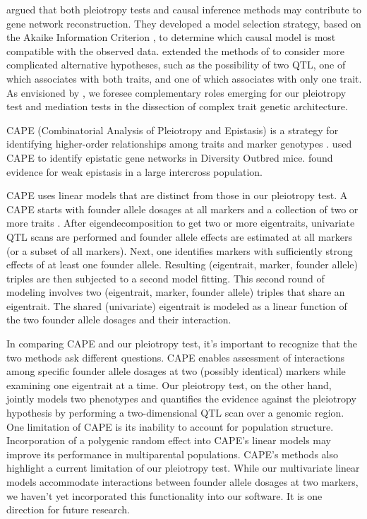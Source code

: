 \documentclass[oneside]{book}\usepackage[]{graphicx}\usepackage[]{color}
\begin{document}
\citet{schadt2005integrative} argued that
both pleiotropy tests and causal inference methods may contribute to gene network
reconstruction. They developed a model selection strategy, based on
the Akaike Information Criterion \citep{akaike1974new}, to determine which
causal model is most compatible with the observed data.
\citet{schadt2005integrative} extended the methods of
\citet{jiang1995multiple} to consider more complicated alternative
hypotheses, such as the possibility of two QTL, one of which
associates with both traits, and one of which associates with only one
trait. As envisioned by \citet{schadt2005integrative}, we foresee
complementary roles emerging for our pleiotropy test
and mediation tests in the dissection of complex trait genetic
architecture.

CAPE (Combinatorial Analysis of Pleiotropy and Epistasis) is a strategy for identifying higher-order relationships among traits and marker genotypes \citep{tyler2013cape}. 
\citet{tyler2017epistatic} used CAPE to identify epistatic gene networks in Diversity Outbred mice. \citet{tyler2016weak} found evidence for weak epistasis in a large intercross population. 

CAPE uses linear models that are distinct from those in our pleiotropy test. 
A CAPE starts with founder allele dosages at all markers and a collection of two or more traits \citep{tyler2017epistatic}. 
After eigendecomposition to get two or more eigentraits, univariate QTL scans are performed and founder allele effects are estimated at all markers (or a subset of all markers). 
Next, one identifies markers with sufficiently strong effects of at least one founder allele. 
Resulting (eigentrait, marker, founder allele) triples are then subjected to a second model fitting. 
This second round of modeling involves two (eigentrait, marker, founder allele) triples that share an eigentrait. 
The shared (univariate) eigentrait is modeled as a linear function of the two founder allele dosages and their interaction. 

In comparing CAPE and our pleiotropy test, it's important to recognize that the two methods ask different questions. 
CAPE enables assessment of interactions among specific founder allele dosages at two (possibly identical) markers while examining one eigentrait at a time. 
Our pleiotropy test, on the other hand, jointly models two phenotypes and quantifies the evidence against the pleiotropy hypothesis by performing a two-dimensional QTL scan over a genomic region. 
One limitation of CAPE is its inability to account for population structure. Incorporation of a polygenic random effect into CAPE's linear models may improve its performance in multiparental populations. 
CAPE's methods also highlight a current limitation of our pleiotropy test. 
While our multivariate linear models accommodate interactions between founder allele dosages at two markers, we haven't yet incorporated this functionality into our software. 
It is one direction for future research.
\end{document}
